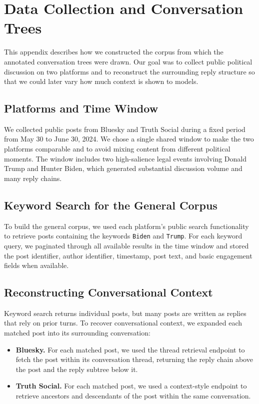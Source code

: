 \documentclass[11pt]{article}
\begin{document}

\appendix
\section{Data Collection and Conversation Trees}
\label{app:data_collection}

This appendix describes how we constructed the corpus from which the annotated
conversation trees were drawn. Our goal was to collect public political discussion on two
platforms and to reconstruct the surrounding reply structure so that we could later vary
how much context is shown to models.

\subsection{Platforms and Time Window}
We collected public posts from Bluesky and Truth Social during a fixed period from
May 30 to June 30, 2024. We chose a single shared window to make the two platforms
comparable and to avoid mixing content from different political moments. The window
includes two high-salience legal events involving Donald Trump and Hunter Biden, which
generated substantial discussion volume and many reply chains.

\subsection{Keyword Search for the General Corpus}
To build the general corpus, we used each platform's public search functionality to
retrieve posts containing the keywords \texttt{Biden} and \texttt{Trump}. For each keyword query,
we paginated through all available results in the time window and stored the post identifier,
author identifier, timestamp, post text, and basic engagement fields when available.

\subsection{Reconstructing Conversational Context}
Keyword search returns individual posts, but many posts are written as replies that rely
on prior turns. To recover conversational context, we expanded each matched post into its
surrounding conversation:

\begin{itemize}
    \item \textbf{Bluesky.} For each matched post, we used the thread retrieval endpoint to
    fetch the post within its conversation thread, returning the reply chain above the post
    and the reply subtree below it.
    \item \textbf{Truth Social.} For each matched post, we used a context-style endpoint
    to retrieve ancestors and descendants of the post within the same conversation.
\end{itemize}
\end{document}
